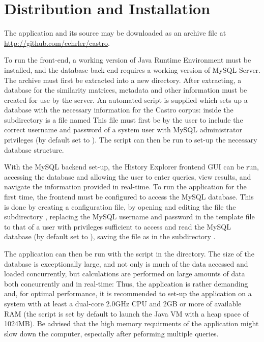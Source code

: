 \section{Distribution and Installation}
The application and its source may be downloaded as an archive file at \url{http://github.com/cehrler/castro}.

To run the front-end, a working version of Java Runtime Environment must be installed, and the database back-end requires a working version of MySQL Server. The archive must first be extracted into a new directory. After extracting, a database for the similarity matrices, metadata and other information must be created for use by the server. An automated script is supplied which sets up a database with the necessary information for the Castro corpus: inside the  subdirectory is a file named  This file must first be by the user to include the correct username and password of a system user with MySQL administrator privileges (by default set to ). The script can then be run to set-up the necessary database structure.

With the MySQL backend set-up, the History Explorer frontend GUI can be run, accessing the database and allowing the user to enter queries, view results, and navigate the information provided in real-time. To run the application for the first time, the frontend must be configured to access the MySQL database. This is done by creating a configuration file, by opening and editing the file  the subdirectory , replacing the MySQL username and password in the template file to that of a user with privileges sufficient to access and read the MySQL database (by default set to ), saving the file as  in the subdirectory .

The application can then be run with the script  in the  directory. The size of the database is exceptionally large, and not only is much of the data accessed and loaded concurrently, but calculations are performed on large amounts of data both concurrently and in real-time: Thus, the application is rather demanding and, for optimal performance, it is recommended to set-up the application on a system with at least a dual-core 2.0GHz CPU and 2GB or more of available RAM (the script is set by default to launch the Java VM with a heap space of 1024MB). Be advised that the high memory requirments of the application might slow down the computer, especially after peforming multiple queries. 

